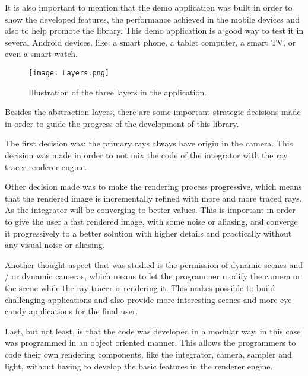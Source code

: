 \par
It is also important to mention that the demo application was built in order to show the developed features, the performance achieved in the mobile devices and also to help promote the library.
This demo application is a good way to test it in several Android devices, like: a smart phone, a tablet computer, a smart TV, or even a smart watch.

\begin{figure}[H]
	\centering
	\caption{Illustration of the three layers in the application.}
	\label{Illustration of the three layers in the application.}
	\texttt{[image: Layers.png]}
\end{figure}

\par
Besides the abstraction layers, there are some important strategic decisions made in order to guide the progress of the development of this library.

\par
The first decision was: the primary rays always have origin in the camera.
This decision was made in order to not mix the code of the integrator with the ray tracer renderer engine.

\par
Other decision made was to make the rendering process progressive, which means that the rendered image is incrementally refined with more and more traced rays.
As the integrator will be converging to better values.
This is important in order to give the user a fast rendered image, with some noise or aliasing, and converge it progressively to a better solution with higher details and practically without any visual noise or aliasing.

\par
Another thought aspect that was studied is the permission of dynamic scenes and / or dynamic cameras, which means to let the programmer modify the camera or the scene while the ray tracer is rendering it.
This makes possible to build challenging applications and also provide more interesting scenes and more eye candy applications for the final user.

\par
Last, but not least, is that the code was developed in a modular way, in this case was programmed in an object oriented manner.
This allows the programmers to code their own rendering components, like the integrator, camera, sampler and light, without having to develop the basic features in the renderer engine.

